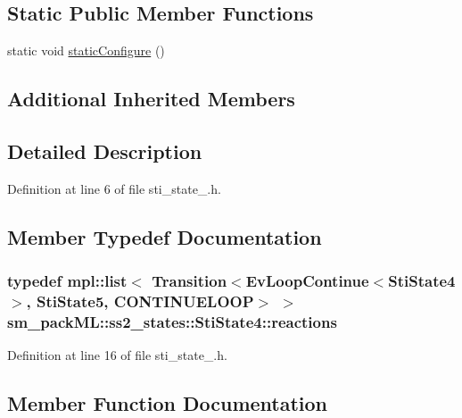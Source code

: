\subsection*{Static Public Member Functions}
\begin{DoxyCompactItemize}
\item 
static void \hyperlink{structsm__packML_1_1ss2__states_1_1StiState4_aab5c46b56d843f4598420df5d9b93db0}{static\+Configure} ()
\end{DoxyCompactItemize}
\subsection*{Additional Inherited Members}


\subsection{Detailed Description}


Definition at line 6 of file sti\+\_\+state\+\_.\+h.



\subsection{Member Typedef Documentation}
\subsubsection[{\texorpdfstring{reactions}{reactions}}]{\setlength{\rightskip}{0pt plus 5cm}typedef mpl\+::list$<$ Transition$<$Ev\+Loop\+Continue$<${\bf Sti\+State4}$>$, {\bf Sti\+State5}, C\+O\+N\+T\+I\+N\+U\+E\+L\+O\+OP$>$ $>$ {\bf sm\+\_\+pack\+M\+L\+::ss2\+\_\+states\+::\+Sti\+State4\+::reactions}}\hypertarget{structsm__packML_1_1ss2__states_1_1StiState4_a7b817c243c22f99b64c60df51b5600db}{}\label{structsm__packML_1_1ss2__states_1_1StiState4_a7b817c243c22f99b64c60df51b5600db}


Definition at line 16 of file sti\+\_\+state\+\_.\+h.



\subsection{Member Function Documentation}

